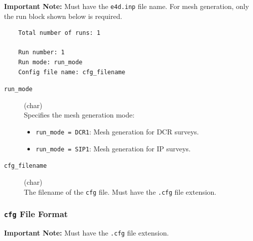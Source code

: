 \documentclass[a4paper,12pt]{article}
\begin{document}
\begin{framed}
    \noindent \textbf{Important Note:} Must have the \texttt{e4d.inp} file name. For mesh generation, only the run block shown below is required.
\end{framed}

\begin{framed}
    \begin{verbatim}
    Total number of runs: 1

    Run number: 1
    Run mode: run_mode
    Config file name: cfg_filename
\end{verbatim}
\end{framed}

\begin{description}
    \item[\texttt{run\_mode}] (char)\hfill \\
          Specifies the mesh generation mode:
          \begin{itemize}
              \item \texttt{run\_mode = DCR1}: Mesh generation for DCR surveys.
              \item \texttt{run\_mode = SIP1}: Mesh generation for IP surveys.
          \end{itemize}

    \item[\texttt{cfg\_filename}] (char)\hfill \\
          The filename of the \texttt{cfg} file. Must have the \texttt{.cfg} file extension.
\end{description}

\newpage
\subsubsection{\texttt{cfg} File Format} \label{mesh_cfg}

\begin{framed}
    \noindent \textbf{Important Note:} Must have the \texttt{.cfg} file extension.
\end{framed}
\end{document}
